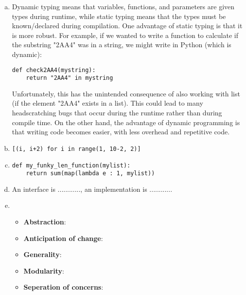 \documentclass[12pt]{article}
\begin{document}
\begin{enumerate}[a)]
\item Dynamic typing means that variables, functions, and parameters are given types during runtime, while static typing means that the types must be known/declared during compilation. One advantage of static typing is that it is more robust. For example, if we wanted to write a function to calculate if the substring "2AA4" was in a string, we might write in Python (which is dynamic):
\begin{lstlisting}
def check2AA4(mystring):
    return "2AA4" in mystring
\end{lstlisting}
Unfortunately, this has the unintended consequence of also working with list (if the element "2AA4" exists in a list). This could lead to many headscratching bugs that occur during the runtime rather than during compile time. On the other hand, the advantage of dynamic programming is that writing code becomes easier, with less overhead and repetitive code.

\item
\begin{lstlisting}
[(i, i+2) for i in range(1, 10-2, 2)]
\end{lstlisting}

\item
\begin{lstlisting}
def my_funky_len_function(mylist):
    return sum(map(lambda e : 1, mylist))
\end{lstlisting}

\item An interface is ............, an implementation is ............

\item
\begin{itemize}[\label{}]
    \item \textbf{Abstraction}:
    \item \textbf{Anticipation of change}:
    \item \textbf{Generality}:
    \item \textbf{Modularity}:
    \item \textbf{Seperation of concerns}:
\end{itemize}

\end{enumerate}


\newpage

\lstset{language=Python, basicstyle=\tiny, breaklines=true, showspaces=false,
  showstringspaces=false, breakatwhitespace=true}
\end{document}

